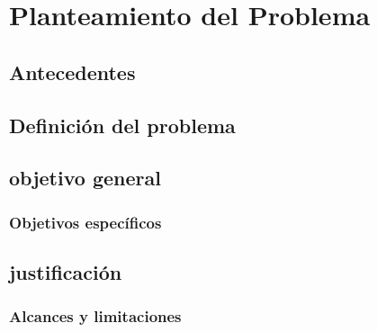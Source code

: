 \chapter{Planteamiento del Problema}
\section{Antecedentes}

\section{Definición del problema}

\section{objetivo general}

\subsection{Objetivos específicos}

\section{justificación}

\subsection{Alcances y limitaciones}